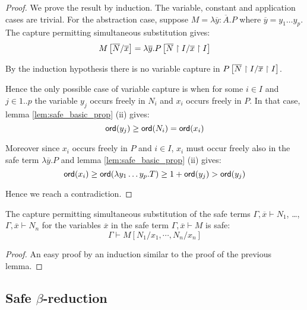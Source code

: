 \begin{proof}
We prove the result by induction. The variable, constant and application cases are trivial.
For the abstraction case, suppose $M = \lambda \overline{y} : \overline{A}. P$ where $\overline{y} = y_1 \ldots y_p$. The capture permitting
simultaneous substitution gives:
$$M \left[ \overline{N}/\overline{x} \right] = \lambda \overline{y} . P
\left[ \overline{N} \upharpoonright I/\overline{x} \upharpoonright I \right]$$


By the induction hypothesis there is no variable capture in $P
\left[ \overline{N} \upharpoonright I/\overline{x} \upharpoonright I \right]$.

Hence the only possible case of variable capture is when for some $i \in I$ and $j \in 1..p$ the variable $y_j$ occurs freely
in $N_i$ and $x_i$ occurs freely in $P$. In that case, lemma \ref{lem:safe_basic_prop} (ii) gives:
$$ {\sf ord}(y_j) \geq {\sf ord}(N_i) = {\sf ord}(x_i)$$

Moreover since $x_i$ occurs freely in $P$ and $i\in I$, $x_i$ must occur freely also in the safe term $\lambda \overline{y}. P$
and lemma \ref{lem:safe_basic_prop} (ii) gives:
$$ {\sf ord}(x_i) \geq {\sf ord}(\lambda y_1 \ldots y_p . T) \geq 1+ {\sf ord}(y_j) > {\sf ord}(y_j)$$

Hence we reach a contradiction.
\end{proof}

\begin{lem}
\label{lem:subst_preserve_safety}

The capture permitting simultaneous substitution of the safe terms
$\Gamma, \overline{x} \vdash N_1$, \ldots, $\Gamma, \overline{x} \vdash N_n$ for
the variables $\overline{x}$ in the safe term $\Gamma, \overline{x} \vdash M$ is safe:
$$ \Gamma \vdash M[N_1 / x_1 , \cdots, N_n / x_n] $$
\end{lem}
\begin{proof}
An easy proof by an induction similar to the proof of the previous lemma.
\end{proof}

\subsection{Safe $\beta$-reduction}

